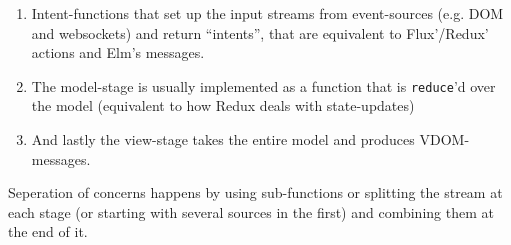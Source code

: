 \begin{enumerate}
\item Intent-functions that set up the input streams from event-sources (e.g. DOM and websockets) and return ``intents'', that are equivalent to Flux'/Redux' actions and Elm's messages.
\item The model-stage is usually implemented as a function that is \texttt{reduce}'d over the model (equivalent to how Redux deals with state-updates)
\item And lastly the view-stage takes the entire model and produces VDOM-messages.
\end{enumerate}

Seperation of concerns happens by using sub-functions or splitting the stream at each stage (or starting with several sources in the first) and combining them at the end of it.

